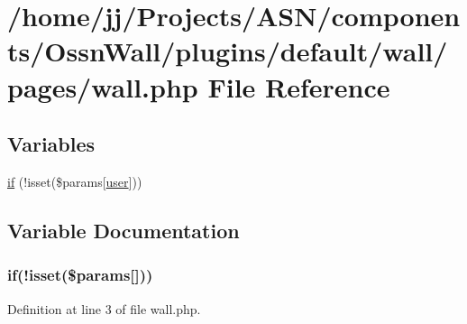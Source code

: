 \hypertarget{wall_2pages_2wall_8php}{}\section{/home/jj/\+Projects/\+A\+S\+N/components/\+Ossn\+Wall/plugins/default/wall/pages/wall.php File Reference}
\label{wall_2pages_2wall_8php}
\subsection*{Variables}
\begin{DoxyCompactItemize}
\item 
\hyperlink{wall_2pages_2wall_8php_a6972bc3c31425e5ab479e1b37a373419}{if} (!isset(\$params\mbox{[}\textquotesingle{}\hyperlink{ossn_8config_8db_8example_8php_a802544b7ba9f79bbf24ef67773d53bed}{user}\textquotesingle{}\mbox{]}))
\end{DoxyCompactItemize}


\subsection{Variable Documentation}
\subsubsection[{\texorpdfstring{if}{if}}]{\setlength{\rightskip}{0pt plus 5cm}if(!isset(\$params\mbox{[}\textquotesingle{}\mbox{]}))}\hypertarget{wall_2pages_2wall_8php_a6972bc3c31425e5ab479e1b37a373419}{}\label{wall_2pages_2wall_8php_a6972bc3c31425e5ab479e1b37a373419}


Definition at line 3 of file wall.\+php.

